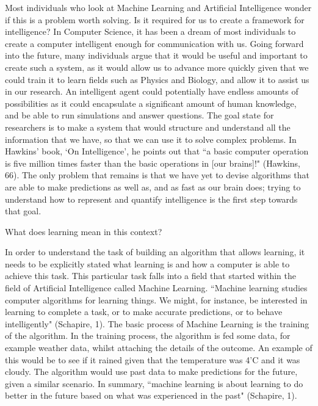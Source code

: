 \documentclass[11pt]{article}
\begin{document}
\par Most individuals who look at Machine Learning and Artificial Intelligence wonder if this is a problem worth solving. Is it required for us to create a framework for intelligence? In Computer Science, it has been a dream of most individuals to create a computer intelligent enough for communication with us. Going forward into the future, many individuals argue that it would be useful and important to create such a system, as it would allow us to advance more quickly given that we could train it to learn fields such as Physics and Biology, and allow it to assist us in our research. An intelligent agent could potentially have endless amounts of possibilities as it could encapsulate a significant amount of human knowledge, and be able to run simulations and answer questions. The goal state for researchers is to make a system that would structure and understand all the information that we have, so that we can use it to solve complex problems. In Hawkins' book, `On Intelligence', he points out that ``a basic computer operation is five million times faster than the basic operations in [our brains]!" (Hawkins, 66). The only problem that remains is that we have yet to devise algorithms that are able to make predictions as well as, and as fast as our brain does; trying to understand how to represent and quantify intelligence is the first step towards that goal.
\newline

\begin{center}
	{\large What does learning mean in this context?\par}
\end{center}

\par In order to understand the task of building an algorithm that allows learning, it needs to be explicitly stated what learning is and how a computer is able to achieve this task. This particular task falls into a field that started within the field of Artificial Intelligence called Machine Learning. ``Machine learning studies computer algorithms for learning things. We might, for instance, be interested in learning to complete a task, or to make accurate predictions, or to behave intelligently" (Schapire, 1). The basic process of Machine Learning is the training of the algorithm. In the training process, the algorithm is fed some data, for example weather data, whilst attaching the details of the outcome. An example of this would be to see if it rained given that the temperature was 4'C and it was cloudy. The algorithm would use past data to make predictions for the future, given a similar scenario. In summary, ``machine learning is about learning to do better in the future based on what was experienced in the past" (Schapire, 1).
\end{document}

